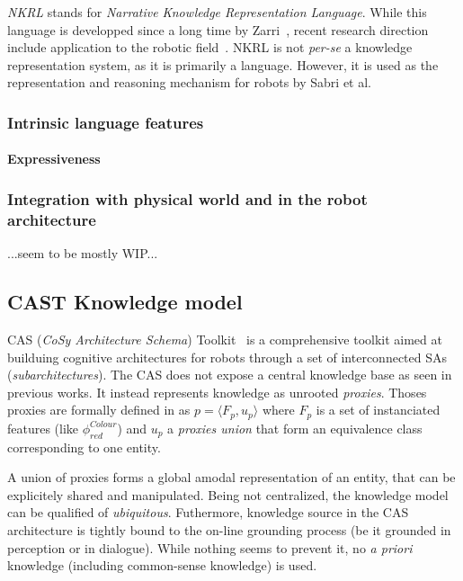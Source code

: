 \documentclass[a4paper, twocolumn]{article}
\begin{document}
\emph{NKRL} stands for \emph{Narrative Knowledge Representation Language}.
While this language is developped since a long time by Zarri~\cite{Zarri1997,
Zarri2008}, recent research direction include application to the robotic
field~\cite{Sabri2011}. NKRL is not {\it per-se} a knowledge representation
system, as it is primarily a language. However, it is used as the
representation and reasoning mechanism for robots by Sabri et al.

\subsubsection{Intrinsic language features}
\label{sect|nkrl-intrinsic-features}

\paragraph{Expressiveness}

\subsubsection{Integration with physical world and in the robot architecture}
\label{sect|nkrl-integration}

...seem to be mostly WIP...


\subsection{CAST Knowledge model}
\label{sect|cast}

CAS (\emph{CoSy Architecture Schema}) Toolkit~\cite{Hawes2007} is a
comprehensive toolkit aimed at builduing cognitive architectures for robots
through a set of interconnected SAs (\emph{subarchitectures}). The CAS does not
expose a central knowledge base as seen in previous works. It instead
represents knowledge as unrooted \emph{proxies}. Thoses proxies are formally
defined in \cite{Jacobsson2008} as $p= \langle F_p, u_p \rangle$ where $F_p$ is
a set of instanciated features (like $\phi^{Colour}_{red}$) and $u_p$ a
\emph{proxies union} that form an equivalence class corresponding to one
entity.

A union of proxies forms a global amodal representation of an entity, that can
be explicitely shared and manipulated. Being not centralized, the knowledge
model can be qualified of \emph{ubiquitous}. Futhermore, knowledge source in
the CAS architecture is tightly bound to the on-line grounding process (be it
grounded in perception or in dialogue). While nothing seems to prevent it, no
{\it a priori} knowledge (including common-sense knowledge) is used.
\end{document}
